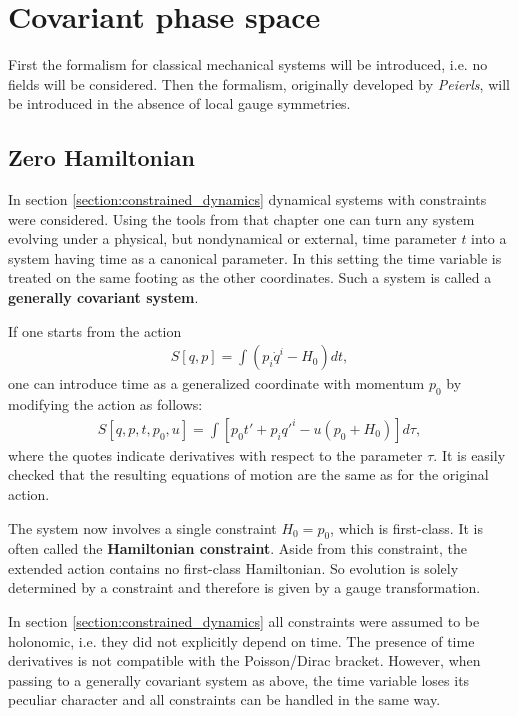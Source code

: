 \section{Covariant phase space}

    First the formalism for classical mechanical systems will be introduced, i.e. no fields will be considered. Then the formalism, originally developed by \textit{Peierls}, will be introduced in the absence of local gauge symmetries.

\subsection{Zero Hamiltonian}

    In section \ref{section:constrained_dynamics} dynamical systems with constraints were considered. Using the tools from that chapter one can turn any system evolving under a physical, but nondynamical or external, time parameter $t$ into a system having time as a canonical parameter. In this setting the time variable is treated on the same footing as the other coordinates. Such a system is called a \textbf{generally covariant system}.

    If one starts from the action
    \begin{gather}
        S[q,p] = \int \left(p_i\dot{q}^i-H_0\right)dt,
    \end{gather}
    one can introduce time as a generalized coordinate with momentum $p_0$ by modifying the action as follows:
    \begin{gather}
        S[q,p,t,p_0,u] = \int \left[p_0t'+p_iq'^i-u(p_0+H_0)\right]d\tau,
    \end{gather}
    where the quotes indicate derivatives with respect to the parameter $\tau$. It is easily checked that the resulting equations of motion are the same as for the original action.

    The system now involves a single constraint $H_0=p_0$, which is first-class. It is often called the \textbf{Hamiltonian constraint}. Aside from this constraint, the extended action contains no first-class Hamiltonian. So evolution is solely determined by a constraint and therefore is given by a gauge transformation.

    \begin{remark}
        In section \ref{section:constrained_dynamics} all constraints were assumed to be holonomic, i.e. they did not explicitly depend on time. The presence of time derivatives is not compatible with the Poisson/Dirac bracket. However, when passing to a generally covariant system as above, the time variable loses its peculiar character and all constraints can be handled in the same way.
    \end{remark}

